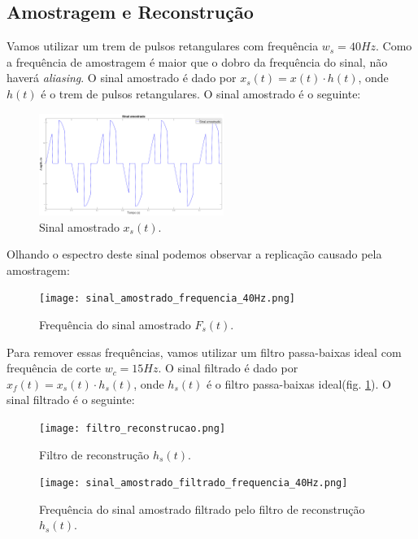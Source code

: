 \documentclass[]{IEEEtran}
\begin{document}
\subsection{Amostragem e Reconstrução}

Vamos utilizar um trem de pulsos retangulares com frequência $w_s = 40Hz$. Como a frequência de amostragem é maior que o dobro da frequência do sinal, não haverá \textit{aliasing}. O sinal amostrado é dado por $x_s(t) = x(t) \cdot h(t)$, onde $h(t)$ é o trem de pulsos retangulares. O sinal amostrado é o seguinte:

\begin{figure}[H]
\captionsetup{justification=centering}
\centering %
\includegraphics[width=6cm]{sinal_amostrado_40hz.png} %
\caption{Sinal amostrado $x_s(t)$.}
\end{figure}

Olhando o espectro deste sinal podemos observar a replicação causado pela amostragem:

\begin{figure}[H]
\captionsetup{justification=centering}
\centering %
\texttt{[image: sinal\_amostrado\_frequencia\_40Hz.png]} %
\caption{Frequência do sinal amostrado $F_s(t)$.}
\end{figure}

Para remover essas frequências, vamos utilizar um filtro passa-baixas ideal com frequência de corte $w_c = 15Hz$. O sinal filtrado é dado por $x_f(t) = x_s(t) \cdot h_s(t)$, onde $h_s(t)$ é o filtro passa-baixas ideal(fig. \ref*{fig:filtro_reconstrucao}). O sinal filtrado é o seguinte:

\begin{figure}[H]
\captionsetup{justification=centering}
\centering %
\texttt{[image: filtro\_reconstrucao.png]} %
\caption{Filtro de reconstrução $h_s(t)$.}
\label{fig:filtro_reconstrucao}
\end{figure}

\begin{figure}[H]
\captionsetup{justification=centering}
\centering %
\texttt{[image: sinal\_amostrado\_filtrado\_frequencia\_40Hz.png]} %
\caption{Frequência do sinal amostrado filtrado pelo filtro de reconstrução $h_s(t)$.}
\end{figure}
\end{document}
